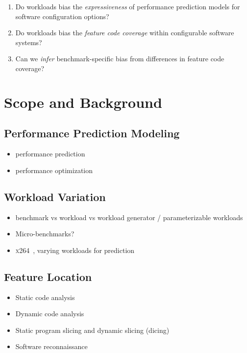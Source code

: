 \documentclass[conference]{IEEEtran}
\begin{document}
\begin{enumerate}
	\item Do workloads bias the \emph{expressiveness} of performance prediction models for software configuration options?
	\item Do workloads bias the \emph{feature code coverage} within configurable software systems?
	\item Can we \emph{infer} benchmark-specific bias from differences in feature code coverage?
\end{enumerate}


\section{Scope and Background}

\subsection{Performance Prediction Modeling}
\begin{itemize}
	\item performance prediction\cite{siegmund_performance-influence_2015,haDeepPerf2019,guo__2013,guo_2018_data,sarkarCostEfficientSamplingPerformance}
	\item performance optimization~\cite{nairUsingBadLearners2017,nairFlash18,ohFindingNearoptimalConfigurations2017}
\end{itemize}
\subsection{Workload Variation}
\begin{itemize}
	\item benchmark vs workload vs workload generator / parameterizable workloads
	\item Micro-benchmarks?
	\item \textsc{x264}~\cite{alves_sampling_2020}, varying workloads for prediction~\cite{liao_2020_using_emse}
\end{itemize}
\subsection{Feature Location}
\begin{itemize}
	\item Static code analysis\cite{velez_2020_configcrusher_jase,lillack_2018_lotrack_tse,luo_2019_cova}
	\item Dynamic code analysis \cite{bell_phosphor_2014,velez_comprex_2021}
	\item Static program slicing and dynamic slicing (dicing)
	\item Software reconnaissance ~\cite{wong_integrated_2005,wilde_early_1996,agrawal_fault_1995,simmons_industrial_2006,chen_dynamic_nodate,sherwood_reducing_nodate}
\end{itemize}
\end{document}
